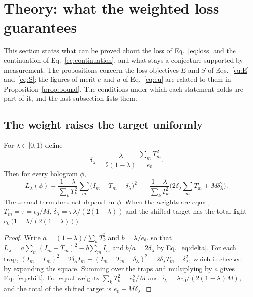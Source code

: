 \section{Theory: what the weighted loss guarantees}\label{sec:theory}

This section states what can be proved about the loss of Eq.~\ref{eq:loss} and the continuation of Eq.~\ref{eq:continuation}, and what stays a conjecture supported by measurement. The propositions concern the loss objectives $E$ and $S$ of Eqs.~\ref{eq:E} and~\ref{eq:S}; the figures of merit $e$ and $u$ of
Eq.~\ref{eq:eu} are related to them in Proposition~\ref{prop:bound}. The conditions under which each statement holds are part of it, and the last subsection lists them.

\subsection{The weight raises the target uniformly}

\begin{proposition}\label{prop:shift}
For $\lambda\in[0,1)$ define
\begin{equation}
\delta_\lambda=\frac{\lambda}{2(1-\lambda)}\,\frac{\sum_mT_m^2}{e_0}.\label{eq:delta}
\end{equation}
Then for every hologram $\phi$,
\begin{equation}
L_\lambda(\phi)=\frac{1-\lambda}{\sum_kT_k^2}\sum_m\big(I_m-T_m-\delta_\lambda\big)^2\;-\;\frac{1-\lambda}{\sum_kT_k^2}\Big(2\delta_\lambda\sum_mT_m+M\delta_\lambda^2\Big).\label{eq:shift}
\end{equation}
The second term does not depend on $\phi$. When the weights are equal, $T_m=\tau=e_0/M$, $\delta_\lambda=\tau\,\lambda/(2(1-\lambda))$ and the shifted target has the total light $e_0\,\big(1+\lambda/(2(1-\lambda))\big)$.
\end{proposition}
\begin{proof}
Write $a=(1-\lambda)/\sum_kT_k^2$ and $b=\lambda/e_0$, so that $L_\lambda=a\sum_m(I_m-T_m)^2-b\sum_mI_m$ and $b/a=2\delta_\lambda$ by Eq.~\ref{eq:delta}. For each trap, $(I_m-T_m)^2-2\delta_\lambda I_m=(I_m-T_m-\delta_\lambda)^2-2\delta_\lambda T_m-\delta_\lambda^2$, which is checked by expanding the square.
Summing over the traps and multiplying by $a$ gives Eq.~\ref{eq:shift}. For equal weights $\sum_kT_k^2=e_0^2/M$ and $\delta_\lambda=\lambda e_0/(2(1-\lambda)M)$, and the total of the shifted target is $e_0+M\delta_\lambda$.
\end{proof}

